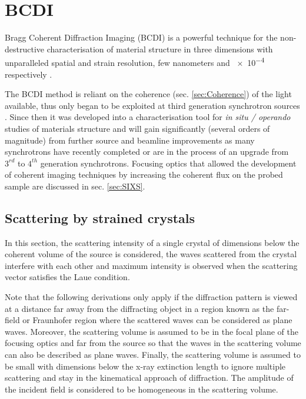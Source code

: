 \section{BCDI} \label{sec:BCDI}

Bragg Coherent Diffraction Imaging (BCDI) \parencite{robinson_coherent_2009} is a powerful technique for the non-destructive characterisation of material structure in three dimensions with unparalleled spatial and strain resolution, few nanometers \parencite{labat_inversion_2015,cherukara_anisotropic_2018} and \num{e-4} respectively \parencite{Newton2010,Lauraux2020}.

The BCDI method is reliant on the coherence (sec. \ref{sec:Coherence}) of the light available, thus only began to be exploited at third generation synchrotron sources \parencite{Miao1999,Miao2000,Robinson2001}.
Since then it was developed into a characterisation tool for \textit{in situ / operando} studies of materials structure \parencite{ulvestad_situ_2016,Kim2019,Carnis2021} and will gain significantly (several orders of magnitude) from further source and beamline improvements as many synchrotrons have recently completed or are in the process of an upgrade from $3^{rd}$ to $4^{th}$ generation synchrotrons.
Focusing optics that allowed the development of coherent imaging techniques by increasing the coherent flux on the probed sample are discussed in sec. \ref{sec:SIXS}.

\subsection{Scattering by strained crystals}\label{sec:StrainBCDI}

In this section, the scattering intensity of a single crystal of dimensions below the coherent volume of the source is considered, the waves scattered from the crystal interfere with each other and maximum intensity is observed when the scattering vector satisfies the Laue condition.

Note that the following derivations only apply if the diffraction pattern is viewed at a distance far away from the diffracting object in a region known as the far-field or Fraunhofer region where the scattered waves can be considered as plane waves.
Moreover, the scattering volume is assumed to be in the focal plane of the focusing optics and far from the source so that the waves in the scattering volume can also be described as plane waves.
Finally, the scattering volume is assumed to be small with dimensions below the x-ray extinction length to ignore multiple scattering and stay in the kinematical approach of diffraction.
The amplitude of the incident field is considered to be homogeneous in the scattering volume.

